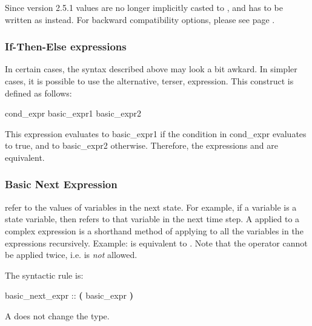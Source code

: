 Since version 2.5.1 \Integer values are no longer implicitly casted
to \Boolean, and  has to be written as  instead.
For backward compatibility options, please see page
\pageref{ref::backwardcompatibility}.

\subsubsection{If-Then-Else expressions}
\label{If-Then-Else expressions}

In certain cases, the syntax described above may look a bit awkard. In
simpler cases, it is possible to use the alternative, terser,
\itebullet expression. This construct is defined as follows:

\begin{Grammar}
        cond_expr  basic_expr1 \operator{:} basic_expr2
\end{Grammar}

This expression evaluates to basic\_expr1 if the condition in
    cond\_expr evaluates to true, and to basic\_expr2 otherwise.
Therefore, the expressions  and  are equivalent.

\subsubsection{Basic Next Expression}
\label{Basic Next Expression}

 refer to the values of variables in the next
state.
%
For example, if a variable  is a state variable, then
 refers to that variable  in
the next time step.
%
A  applied to a complex expression is a
shorthand method of applying  to all the variables in
the expressions recursively.
%
Example:  is equivalent to
.
%
Note that the  operator cannot be applied twice, i.e.
 is \emph{not} allowed.

The syntactic rule is:

\begin{Grammar}
basic_next_expr ::  \textbf{(} basic_expr \textbf{)}
\end{Grammar}
%
A  does not change the type.

